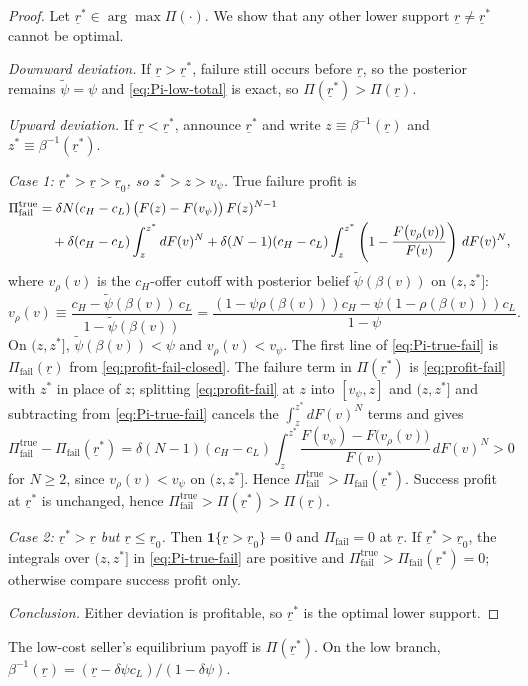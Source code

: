 \begin{proof}
Let $\underline{r}^{*}\in\arg\max\Pi(\cdot)$.  We show that any other lower
support $\underline{r}\neq\underline{r}^{*}$ cannot be optimal.

\smallskip\noindent
\textit{Downward deviation.}
If $\underline{r}>\underline{r}^{*}$, failure still occurs before $\underline{r}$,
so the posterior remains $\tilde{\psi}=\psi$ and
\eqref{eq:Pi-low-total} is exact, so $\Pi(\underline{r}^{*})>\Pi(\underline{r})$.

\smallskip\noindent
\textit{Upward deviation.}
If $\underline{r}<\underline{r}^{*}$, announce $\underline{r}^{*}$ and write
$z\equiv\beta^{-1}(\underline{r})$ and $z^{*}\equiv\beta^{-1}(\underline{r}^{*})$.

\smallskip\noindent
\emph{Case 1: $\underline{r}^{*}>\underline{r}>\underline{r}_0$, so $z^{*}>z>v_{\psi}$.}
True failure profit is
\begin{align}
  \Pi_{\text{fail}}^{\text{true}}
  &= \delta N (c_H - c_L)\,
    \bigl(F(z) - F(v_{\psi})\bigr)\,
    F(z)^{N-1}
  \notag\\
  &\quad + \delta (c_H - c_L)
    \int_{z}^{z^{*}} dF(v)^{N}
    + \delta (N-1) (c_H - c_L)
    \int_{z}^{z^{*}}
      \left(1 - \frac{F\bigl(v_{\rho}(v)\bigr)}{F(v)}\right)\, dF(v)^{N},
  \label{eq:Pi-true-fail}
\end{align}
where $v_{\rho}(v)$ is the $c_H$-offer cutoff with posterior belief
$\tilde{\psi}(\beta(v))$ on $(z,z^{*}]$:
\[
  v_{\rho}(v)
  \equiv \frac{c_H-\tilde{\psi}(\beta(v))\,c_L}{1-\tilde{\psi}(\beta(v))}
  = \frac{(1-\psi\rho(\beta(v)))c_H-\psi(1-\rho(\beta(v)))c_L}{1-\psi}.
\]
On $(z,z^{*}]$, $\tilde{\psi}(\beta(v))<\psi$ and $v_{\rho}(v)<v_{\psi}$.
The first line of \eqref{eq:Pi-true-fail} is $\Pi_{\text{fail}}(\underline{r})$
from \eqref{eq:profit-fail-closed}.
The failure term in $\Pi(\underline{r}^{*})$ is \eqref{eq:profit-fail} with
$z^{*}$ in place of $z$; splitting \eqref{eq:profit-fail} at $z$ into
$[v_{\psi},z]$ and $(z,z^{*}]$ and subtracting from \eqref{eq:Pi-true-fail}
cancels the $\int_{z}^{z^{*}} dF(v)^{N}$ terms and gives
\[
  \Pi_{\text{fail}}^{\text{true}} - \Pi_{\text{fail}}(\underline{r}^{*})
  = \delta (N-1) (c_H - c_L)
    \int_{z}^{z^{*}}
      \frac{F(v_{\psi}) - F\bigl(v_{\rho}(v)\bigr)}{F(v)}\,
      dF(v)^{N}
  > 0
\]
for $N\ge 2$, since $v_{\rho}(v)<v_{\psi}$ on $(z,z^{*}]$.
Hence $\Pi_{\text{fail}}^{\text{true}}>\Pi_{\text{fail}}(\underline{r}^{*})$.
Success profit at $\underline{r}^{*}$ is unchanged, hence
$\Pi_{\text{fail}}^{\text{true}}>\Pi(\underline{r}^{*})>\Pi(\underline{r})$.

\smallskip\noindent
\emph{Case 2: $\underline{r}^{*}>\underline{r}$ but $\underline{r}\le\underline{r}_0$.}
Then $\mathbf{1}\{\underline{r}>\underline{r}_0\}=0$ and $\Pi_{\text{fail}}=0$ at
$\underline{r}$.
If $\underline{r}^{*}>\underline{r}_0$, the integrals over $(z,z^{*}]$ in
\eqref{eq:Pi-true-fail} are positive and
$\Pi_{\text{fail}}^{\text{true}}>\Pi_{\text{fail}}(\underline{r}^{*})=0$; otherwise
compare success profit only.

\smallskip\noindent
\textit{Conclusion.}
Either deviation is profitable, so $\underline{r}^{*}$ is the optimal lower
support.
\end{proof}

The low-cost seller's equilibrium payoff is $\Pi(\underline{r}^{*})$. On the
low branch,
$\beta^{-1}(\underline{r})=(\underline{r}-\delta\psi c_L)/(1-\delta\psi)$.

